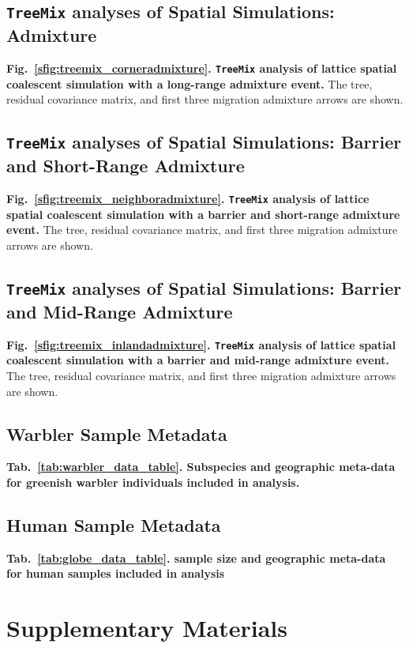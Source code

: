 \documentclass[10pt,letterpaper]{article}
\begin{document}
\subsection*{\texttt{TreeMix} analyses of Spatial Simulations: Admixture}
\label{treemix_corneradmixture}
{\bf{Fig.\ \ref{sfig:treemix_corneradmixture}. \texttt{TreeMix} analysis of lattice spatial coalescent simulation with a long-range admixture event.}}
The tree, residual covariance matrix, and first three migration admixture arrows are shown.

\subsection*{\texttt{TreeMix} analyses of Spatial Simulations: Barrier and Short-Range Admixture}
\label{treemix_neighboradmixture}
{\bf{Fig.\ \ref{sfig:treemix_neighboradmixture}. \texttt{TreeMix} analysis of lattice spatial coalescent simulation with a barrier and short-range admixture event.}}  
The tree, residual covariance matrix, and first three migration admixture arrows are shown.

\subsection*{\texttt{TreeMix} analyses of Spatial Simulations: Barrier and Mid-Range Admixture}
\label{treemix_inlandadmixture}
{\bf{Fig.\ \ref{sfig:treemix_inlandadmixture}. \texttt{TreeMix} analysis of lattice spatial coalescent simulation with a barrier and mid-range admixture event.}}  
The tree, residual covariance matrix, and first three migration admixture arrows are shown.

\subsection*{Warbler Sample Metadata}
\label{warbler_data_table}
{\bf{Tab.\ \ref{tab:warbler_data_table}. Subspecies and geographic meta-data for greenish warbler individuals included in analysis.}}

\subsection*{Human Sample Metadata}
\label{globe_data_table}
{\bf{Tab.\ \ref{tab:globe_data_table}. sample size and geographic meta-data for human samples included in analysis}}

\newpage
\section*{Supplementary Materials}
\renewcommand{\thefigure}{S\arabic{figure}}
\setcounter{figure}{0}
\renewcommand{\thetable}{S\arabic{table}}
\setcounter{table}{0}
\renewcommand{\theequation}{S\arabic{table}}
\setcounter{equation}{0}
\end{document}
